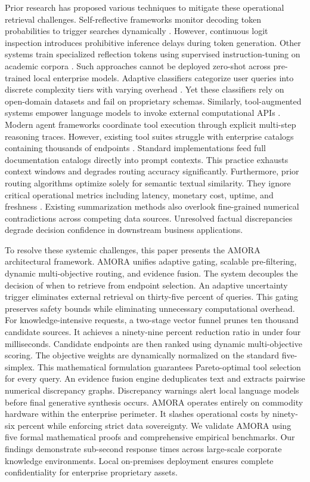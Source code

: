 \documentclass[fleqn,10pt]{article}
\begin{document}
Prior research has proposed various techniques to mitigate these operational retrieval challenges. Self-reflective frameworks monitor decoding token probabilities to trigger searches dynamically \cite{jiang2023flare}. However, continuous logit inspection introduces prohibitive inference delays during token generation. Other systems train specialized reflection tokens using supervised instruction-tuning on academic corpora \cite{asai2023selfrag}. Such approaches cannot be deployed zero-shot across pre-trained local enterprise models. Adaptive classifiers categorize user queries into discrete complexity tiers with varying overhead \cite{jeong2024adaptiverag,wang2023skr}. Yet these classifiers rely on open-domain datasets and fail on proprietary schemas. Similarly, tool-augmented systems empower language models to invoke external computational APIs \cite{schick2023toolformer,yao2022react}. Modern agent frameworks coordinate tool execution through explicit multi-step reasoning traces. However, existing tool suites struggle with enterprise catalogs containing thousands of endpoints \cite{patil2023gorilla,qin2023toolllm}. Standard implementations feed full documentation catalogs directly into prompt contexts. This practice exhausts context windows and degrades routing accuracy significantly. Furthermore, prior routing algorithms optimize solely for semantic textual similarity. They ignore critical operational metrics including latency, monetary cost, uptime, and freshness \cite{burges2010lambdamart,zhang2007moea}. Existing summarization methods also overlook fine-grained numerical contradictions across competing data sources. Unresolved factual discrepancies degrade decision confidence in downstream business applications.

To resolve these systemic challenges, this paper presents the AMORA architectural framework. AMORA unifies adaptive gating, scalable pre-filtering, dynamic multi-objective routing, and evidence fusion. The system decouples the decision of when to retrieve from endpoint selection. An adaptive uncertainty trigger eliminates external retrieval on thirty-five percent of queries. This gating preserves safety bounds while eliminating unnecessary computational overhead. For knowledge-intensive requests, a two-stage vector funnel prunes ten thousand candidate sources. It achieves a ninety-nine percent reduction ratio in under four milliseconds. Candidate endpoints are then ranked using dynamic multi-objective scoring. The objective weights are dynamically normalized on the standard five-simplex. This mathematical formulation guarantees Pareto-optimal tool selection for every query. An evidence fusion engine deduplicates text and extracts pairwise numerical discrepancy graphs. Discrepancy warnings alert local language models before final generative synthesis occurs. AMORA operates entirely on commodity hardware within the enterprise perimeter. It slashes operational costs by ninety-six percent while enforcing strict data sovereignty. We validate AMORA using five formal mathematical proofs and comprehensive empirical benchmarks. Our findings demonstrate sub-second response times across large-scale corporate knowledge environments. Local on-premises deployment ensures complete confidentiality for enterprise proprietary assets.
\end{document}
